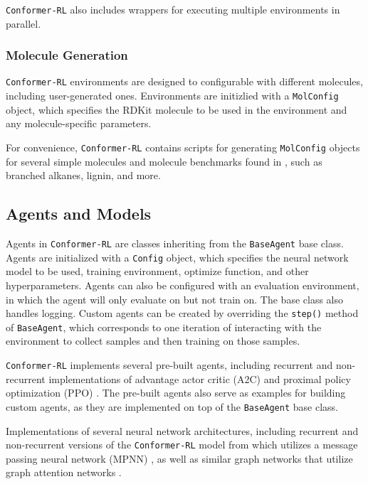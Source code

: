 \documentclass[twoside,11pt]{article}
\newcommand{\code}[1]{\texttt{#1}}
\newcommand{\titleofpaper}{Conformer-RL}
\begin{document}
\code{\titleofpaper} also includes wrappers for executing multiple environments in parallel. 

  \subsubsection{Molecule Generation}
  \code{\titleofpaper} environments are designed to configurable with different molecules, including user-generated ones. Environments are initizlied with a \code{MolConfig} object, which specifies the RDKit molecule to be used in the environment and any molecule-specific parameters.

  For convenience, \code{\titleofpaper} contains scripts for generating \code{MolConfig} objects for several simple molecules and molecule benchmarks found in \citet{gogineni2020torsionnet}, such as branched alkanes, lignin, and more.

\subsection{Agents and Models}
Agents in \code{\titleofpaper} are classes inheriting from the \code{BaseAgent} base class. Agents are initialized with a \code{Config} object, which specifies the neural network model to be used, training environment, optimize function, and other hyperparameters. Agents can also be configured with an evaluation environment, in which the agent will only evaluate on but not train on. The base class also handles logging. Custom agents can be created by overriding the \code{step()} method of \code{BaseAgent}, which corresponds to one iteration of interacting with the environment to collect samples and then training on those samples.

\code{\titleofpaper} implements several pre-built agents, including recurrent and non-recurrent implementations of advantage actor critic (A2C) \citep{wu2017a2c} and proximal policy optimization (PPO) \citep{schulman2017ppo}. The pre-built agents also serve as examples for building custom agents, as they are implemented on top of the \code{BaseAgent} base class.

Implementations of several neural network architectures, including recurrent and non-recurrent versions of the \code{\titleofpaper} model from \citep{gogineni2020torsionnet} which utilizes a message passing neural network (MPNN) \citep{gilmer2017mpnn}, as well as similar graph networks that utilize graph attention networks \citep{gatnn}.
\end{document}
